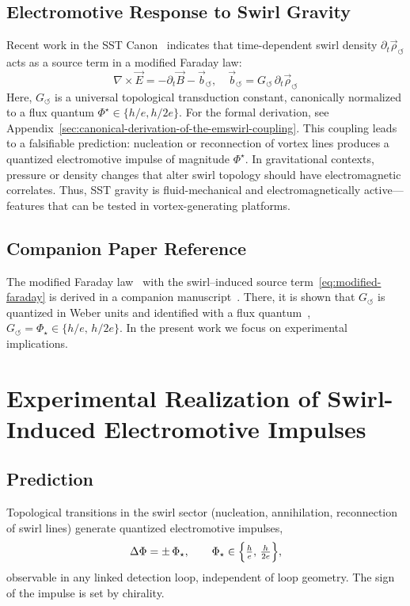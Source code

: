 \documentclass[reprint,aps,onecolumn,nofootinbib]{revtex4-2}
\begin{document}
    \subsection{Electromotive Response to Swirl Gravity}
        Recent work in the SST Canon~\cite{Iskandarani2025EMG} indicates that time-dependent swirl density $\partial_t \vec{\rho}_{\circlearrowleft}$ acts as a source term in a modified Faraday law:
        \[
            \nabla \times \vec{E} = -\partial_t \vec{B} - \vec{b}_{\circlearrowleft}, \quad \vec{b}_{\circlearrowleft} = G_{\circlearrowleft} \, \partial_t \vec{\rho}_{\circlearrowleft}\label{eq:modified-faraday}
        \]
        Here, $G_{\circlearrowleft}$ is a universal topological transduction constant, canonically normalized to a flux quantum $\Phi^\star \in \{ h/e, h/2e \}$.
        For the formal derivation, see Appendix~\ref{sec:canonical-derivation-of-the-emswirl-coupling}.
        This coupling leads to a falsifiable prediction: nucleation or reconnection of vortex lines produces a quantized electromotive impulse of magnitude $\Phi^\star$. In gravitational contexts, pressure or density changes that alter swirl topology should have electromagnetic correlates. Thus, SST gravity is fluid-mechanical and electromagnetically active—features that can be tested in vortex-generating platforms.

    \subsection*{Companion Paper Reference}
        The modified Faraday law~\cite{Iskandarani2025EMG} with the swirl–induced source term~\eqref{eq:modified-faraday} is derived in a companion manuscript~\cite{Iskandarani2025EMG}. There, it is shown that $G_{\!\boldsymbol{\circlearrowleft}}$ is quantized in Weber units and identified with a flux quantum~\cite{DeaverFairbank1961,LittleParks1962}, $G_{\!\boldsymbol{\circlearrowleft}} = \Phi_\star \in \{h/e,\,h/2e\}$. In the present work we focus on experimental implications.


\section{Experimental Realization of Swirl-Induced Electromotive Impulses}
\label{sec:exp-impulses}

    \subsection{Prediction}
    Topological transitions in the swirl sector (nucleation, annihilation, reconnection of swirl lines)
    generate quantized electromotive impulses,
    \begin{equation}
    \Delta\Phi = \pm\,\Phi_\star,
    \qquad
    \Phi_\star \in \Bigl\{ \tfrac{h}{e},\,\tfrac{h}{2e}\Bigr\},
    \end{equation}
    observable in any linked detection loop, independent of loop geometry. The sign of the impulse is set
    by chirality.
\end{document}
